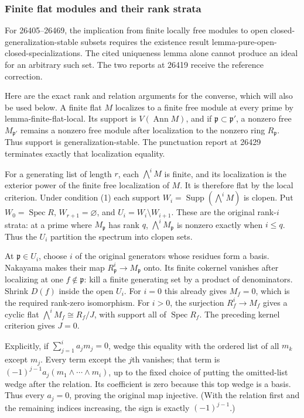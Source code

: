 \subsubsection{Finite flat modules and their rank strata}\label{algebra-proof-022-finite-flat-modules-and-their-rank-strata}

For 26405--26469, the implication from finite locally free modules to open closed-generalization-stable subsets requires the existence result lemma-pure-open-closed-specializations. The cited uniqueness lemma alone cannot produce an ideal for an arbitrary such set. The two reports at 26419 receive the reference correction.

Here are the exact rank and relation arguments for the converse, which will also be used below. A finite flat \(M\) localizes to a finite free module at every prime by lemma-finite-flat-local. Its support is \(V(\operatorname{Ann}M)\), and if \(\mathfrak p\subset\mathfrak p'\), a nonzero free \(M_{\mathfrak p'}\) remains a nonzero free module after localization to the nonzero ring \(R_{\mathfrak p}\). Thus support is generalization-stable. The punctuation report at 26429 terminates exactly that localization equality.

For a generating list of length \(r\), each \(\bigwedge^i M\) is finite, and its localization is the exterior power of the finite free localization of \(M\). It is therefore flat by the local criterion. Under condition (1) each support \(W_i=\operatorname{Supp}(\bigwedge^iM)\) is clopen. Put \(W_0=\operatorname{Spec}R\), \(W_{r+1}=\varnothing\), and \(U_i=W_i\setminus W_{i+1}\). These are the original rank-\(i\) strata: at a prime where \(M_{\mathfrak p}\) has rank \(q\), \(\bigwedge^i M_{\mathfrak p}\) is nonzero exactly when \(i\le q\). Thus the \(U_i\) partition the spectrum into clopen sets.

At \(\mathfrak p\in U_i\), choose \(i\) of the original generators whose residues form a basis. Nakayama makes their map \(R_{\mathfrak p}^i\to M_{\mathfrak p}\) onto. Its finite cokernel vanishes after localizing at one \(f\notin\mathfrak p\): kill a finite generating set by a product of denominators. Shrink \(D(f)\) inside the open \(U_i\). For \(i=0\) this already gives \(M_f=0\), which is the required rank-zero isomorphism. For \(i>0\), the surjection \(R_f^i\to M_f\) gives a cyclic flat \(\bigwedge^iM_f\cong R_f/J\), with support all of \(\operatorname{Spec}R_f\). The preceding kernel criterion gives \(J=0\).

Explicitly, if \(\sum_{j=1}^i a_jm_j=0\), wedge this equality with the ordered list of all \(m_k\) except \(m_j\). Every term except the \(j\)th vanishes; that term is \((-1)^{j-1}a_j(m_1\wedge\cdots\wedge m_i)\), up to the fixed choice of putting the omitted-list wedge after the relation. Its coefficient is zero because this top wedge is a basis. Thus every \(a_j=0\), proving the original map injective. (With the relation first and the remaining indices increasing, the sign is exactly \((-1)^{j-1}\).)


